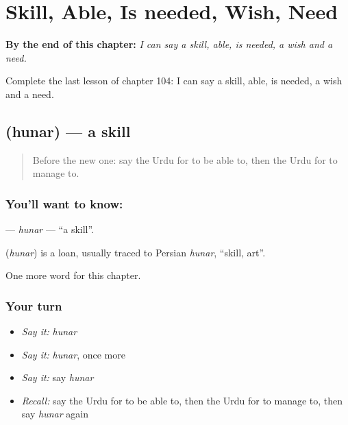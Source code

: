 
\chapter{Skill, Able, Is needed, Wish, Need}
\label{ch:ur-skill-able-is-needed-wish-need}

\begin{chapteropening}
\textbf{By the end of this chapter:} \emph{I can say a skill, able, is needed, a wish and a need.}

Complete the last lesson of chapter 104: I can say a skill, able, is needed, a wish and a need.
\end{chapteropening}

\section[\texorpdfstring{\ur{ہنر} (hunar)}{ہنر (hunar)}]{ (hunar) — a skill}

\label{lesson:UR-C104-hunar}



\begin{quote}
Before the new one: say the Urdu for to be able to, then the Urdu for to manage to.
\end{quote}

\subsection*{You'll want to know: }
\textbf{} — \emph{hunar} — \textquotedblleft{}a skill\textquotedblright{}.

\begin{cousinweb}
\textbf{} (\emph{hunar}) is a loan, usually traced to Persian \emph{hunar}, \textquotedblleft{}skill, art\textquotedblright{}.
\end{cousinweb}

\begin{grammarlens}[title={What you've built}]
One more word for this chapter.
\end{grammarlens}

\subsection*{Your turn}
\begin{itemize}
\raggedright
  \item \emph{Say it:} \emph{hunar}
  \item \emph{Say it:} \emph{hunar}, once more
  \item \emph{Say it:} say \emph{hunar}
  \item \emph{Recall:} say the Urdu for to be able to, then the Urdu for to manage to, then say \emph{hunar} again
\end{itemize}

